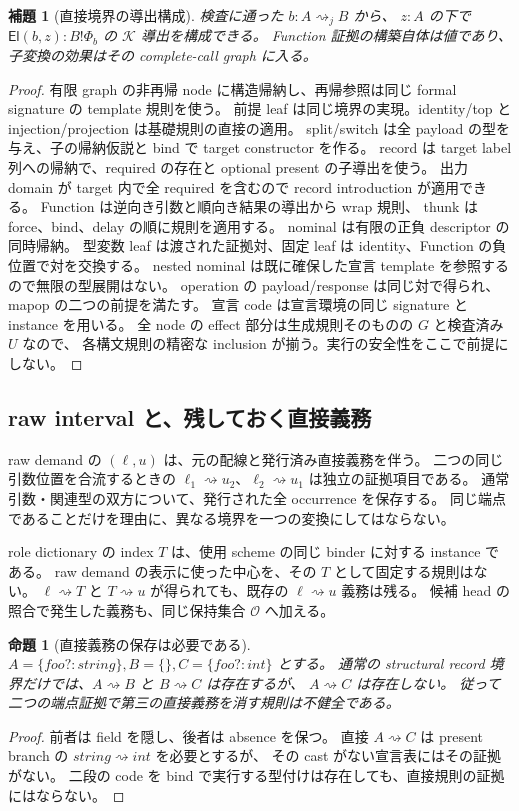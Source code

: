\documentclass[11pt,a4paper]{article}
\newtheorem{lemma}[definition]{補題}
\newtheorem{proposition}[definition]{命題}
\newcommand{\El}{\mathsf{El}}
\newcommand{\Core}{\mathcal K}
\newcommand{\Dir}{\mathrel{\rightsquigarrow}}
\begin{document}
\begin{lemma}[直接境界の導出構成]
検査に通った \(b:A\Dir_j B\) から、
\(z:A\) の下で \(\El(b,z):B!\Phi_b\) の \(\Core\) 導出を構成できる。
Function 証拠の構築自体は値であり、子変換の効果はその complete-call graph に入る。
\end{lemma}
\begin{proof}
有限 graph の非再帰 node に構造帰納し、再帰参照は同じ formal signature の template 規則を使う。
前提 leaf は同じ境界の実現。identity/top と injection/projection は基礎規則の直接の適用。
split/switch は全 payload の型を与え、子の帰納仮説と bind で target constructor を作る。
record は target label 列への帰納で、required の存在と optional present の子導出を使う。
出力 domain が target 内で全 required を含むので record introduction が適用できる。
Function は逆向き引数と順向き結果の導出から wrap 規則、
thunk は force、bind、delay の順に規則を適用する。
nominal は有限の正負 descriptor の同時帰納。
型変数 leaf は渡された証拠対、固定 leaf は identity、Function の負位置で対を交換する。
nested nominal は既に確保した宣言 template を参照するので無限の型展開はない。
operation の payload/response は同じ対で得られ、mapop の二つの前提を満たす。
宣言 code は宣言環境の同じ signature と instance を用いる。
全 node の effect 部分は生成規則そのものの \(G\) と検査済み \(U\) なので、
各構文規則の精密な inclusion が揃う。実行の安全性をここで前提にしない。
\end{proof}

\subsection{raw interval と、残しておく直接義務}

raw demand の \((\ell,u)\) は、元の配線と発行済み直接義務を伴う。
二つの同じ引数位置を合流するときの
\(\ell_1\Dir u_2\)、\(\ell_2\Dir u_1\) は独立の証拠項目である。
通常引数・関連型の双方について、発行された全 occurrence を保存する。
同じ端点であることだけを理由に、異なる境界を一つの変換にしてはならない。

role dictionary の index \(T\) は、使用 scheme の同じ binder に対する instance である。
raw demand の表示に使った中心を、その \(T\) として固定する規則はない。
\(\ell\Dir T\) と \(T\Dir u\) が得られても、既存の \(\ell\Dir u\) 義務は残る。
候補 head の照合で発生した義務も、同じ保持集合 \(\mathcal O\) へ加える。

\begin{proposition}[直接義務の保存は必要である]
\(A=\{foo?:string\}, B=\{\}, C=\{foo?:int\}\) とする。
通常の structural record 境界だけでは、\(A\Dir B\) と \(B\Dir C\) は存在するが、
\(A\Dir C\) は存在しない。
従って二つの端点証拠で第三の直接義務を消す規則は不健全である。
\end{proposition}
\begin{proof}
前者は field を隠し、後者は absence を保つ。
直接 \(A\Dir C\) は present branch の \(string\Dir int\) を必要とするが、
その cast がない宣言表にはその証拠がない。
二段の code を bind で実行する型付けは存在しても、直接規則の証拠にはならない。
\end{proof}
\end{document}
